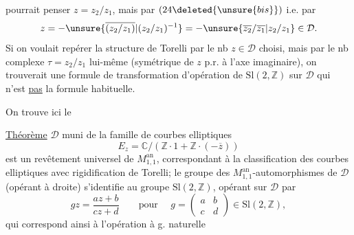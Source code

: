  pourrait penser $z=z_2/z_1$,  mais par $(24\deleted{\unsure{bis}})$ i.e. par
\[
z=-\unsure{\overline{(z_2/z_1)}|(z_2/z_1)^{-1}}
=-\unsure{\overline{z_2}/\overline{z_1}|z_2/z_1}\in\mathcal D.
\]
Si on voulait repérer  la structure de Torelli par le nb $z\in\mathcal D$ choisi, mais par le nb complexe $\tau=z_2/z_1$ lui-même (symétrique de $z$ p.r. à l'axe imaginaire), on trouverait une formule de transformation d'opération de $\mathrm{Sl}(2,\mathbb Z)$ sur $\mathcal D$ qui n'est \uline{pas} la formule habituelle.


On trouve ici le

\uline{Théorème} $\mathcal D$  muni de la famille  de courbes elliptiques
\[
E_z=\mathbb C/(\mathbb Z\cdot1+\mathbb Z\cdot(-\overline z))
\]
est un revêtement universel de $M_{1,1}^{\mathrm{an}}$, correspondant à la classification des courbes elliptiques avec rigidification de Torelli; le groupe des $M_{1,1}^{\mathrm{an}}$-automorphismes de $\mathcal D$ (opérant à droite) s'identifie au groupe $\mathrm{Sl}(2,\mathbb Z)$, opérant sur $\mathcal D$ par
\[
gz=\frac{az+b}{cz+d}\qquad\text{pour }\quad
g=\begin{pmatrix}a&b\\c&d\end{pmatrix}\in\mathrm{Sl}(2,\mathbb Z),
\]
qui correspond ainsi à l'opération à g. naturelle
